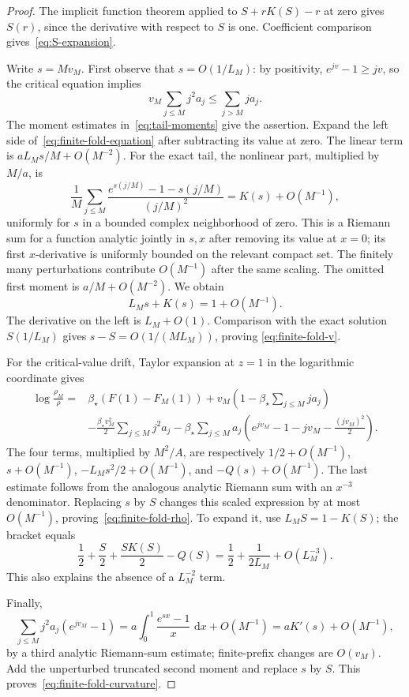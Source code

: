 \documentclass[11pt,a4paper]{article}
\numberwithin{equation}{section}
\theoremstyle{definition}
\theoremstyle{remark}
\newcommand{\dd}{\,\mathrm d}
\newcommand{\bs}{\beta_\star}
\begin{document}
\begin{proof}
The implicit function theorem applied to \(S+rK(S)-r\) at zero gives
\(S(r)\), since the derivative with respect to \(S\) is one. Coefficient
comparison gives~\eqref{eq:S-expansion}.

Write \(s=Mv_M\). First observe that \(s=O(1/L_M)\): by positivity,
\(e^{jv}-1\ge jv\), so the critical equation implies
\[
 v_M\sum_{j\le M}j^2a_j\le\sum_{j>M}ja_j.
\]
The moment estimates in~\eqref{eq:tail-moments} give the assertion.
Expand the left side of~\eqref{eq:finite-fold-equation} after subtracting
its value at zero. The linear term is \(aL_Ms/M+O(M^{-2})\).
For the exact tail, the nonlinear part, multiplied by \(M/a\), is
\[
 \frac1M\sum_{j\le M}
 \frac{e^{s(j/M)}-1-s(j/M)}{(j/M)^2}=K(s)+O(M^{-1}),
\]
uniformly for \(s\) in a bounded complex neighborhood of zero. This is a
Riemann sum for a function analytic jointly in \(s,x\) after removing
its value at \(x=0\); its first \(x\)-derivative is uniformly bounded
on the relevant compact set. The finitely many perturbations contribute
\(O(M^{-1})\) after the same scaling. The omitted first moment is
\(a/M+O(M^{-2})\). We obtain
\begin{equation}
 L_Ms+K(s)=1+O(M^{-1}).
 \label{eq:fold-approx-equation}
\end{equation}
The derivative on the left is \(L_M+O(1)\). Comparison with the exact
solution \(S(1/L_M)\) gives \(s-S=O(1/(ML_M))\), proving
\eqref{eq:finite-fold-v}.

For the critical-value drift, Taylor expansion at \(z=1\) in the
logarithmic coordinate gives
\begin{align*}
 \log\frac{\rho_M}{\rho}
 ={}&\bs(F(1)-F_M(1))
 +v_M\left(1-\bs\sum_{j\le M}ja_j\right)\\
 &-\frac{\bs v_M^2}{2}\sum_{j\le M}j^2a_j
 -\bs\sum_{j\le M}a_j
 \left(e^{jv_M}-1-jv_M-\frac{(jv_M)^2}{2}\right).
\end{align*}
The four terms, multiplied by \(M^2/A\), are respectively
\(1/2+O(M^{-1})\), \(s+O(M^{-1})\),
\(-L_Ms^2/2+O(M^{-1})\), and \(-Q(s)+O(M^{-1})\).
The last estimate follows from the analogous analytic Riemann sum with
an \(x^{-3}\) denominator. Replacing \(s\) by \(S\) changes this scaled
expression by at most \(O(M^{-1})\), proving~\eqref{eq:finite-fold-rho}.
To expand it, use \(L_MS=1-K(S)\); the bracket equals
\[
 \frac12+\frac S2+\frac{SK(S)}2-Q(S)
 =\frac12+\frac{1}{2L_M}+O(L_M^{-3}).
\]
This also explains the absence of a \(L_M^{-2}\) term.

Finally,
\[
 \sum_{j\le M}j^2a_j(e^{jv_M}-1)
 =a\int_0^1\frac{e^{sx}-1}{x}\,\dd x+O(M^{-1})
 =aK'(s)+O(M^{-1}),
\]
by a third analytic Riemann-sum estimate; finite-prefix changes are
\(O(v_M)\). Add the unperturbed truncated second moment and replace
\(s\) by \(S\). This proves~\eqref{eq:finite-fold-curvature}.
\end{proof}
\end{document}

